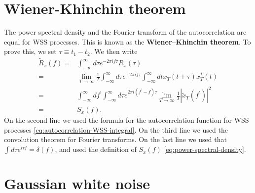 \section{Wiener-Khinchin theorem}

The power spectral density and the Fourier transform of the autocorrelation are
equal for WSS processes. 
This is known as the \textbf{Wiener–Khinchin theorem}.
To prove this, we set $\tau\equiv t_1-t_2$. We then write 
\begin{align}
    \tilde{R}_{x}\left(f\right)
    =& 
    \int_{-\infty}^{\infty}d\tau e^{-2\pi i f \tau}R_{x}\left(\tau\right)
    \nonumber\\
    =& 
    \lim_{T\to\infty}\frac{1}{T}\int_{-\infty}^{\infty}d\tau e^{-2\pi i f \tau} 
    \int_{-\infty}^{\infty} dt x_T\left(t+\tau\right)x^*_T\left(t\right)
    \nonumber\\
    =& 
    \int_{-\infty}^{\infty}df^{\prime}  
    \int_{-\infty}^{\infty}d\tau
        e^{2\pi i \left(f^{\prime}-f\right)\tau} 
        \lim_{T\to\infty}\frac{1}{T}\left|\tilde{x}_T\left(f^{\prime}\right)\right|^2 
    \nonumber\\
    =& 
    S_{x}\left(f\right) 
    .
\end{align}
On the second line we used the formula for the autocorrelation function
for WSS processes \eqref{eq:autocorrelation-WSS-integral}.
On the third line we used the convolution theorem for Fourier transforms.
On the last line we used that $\int d\tau e^{i\tau f}=\delta(f)$, and
used the definition of $S_x(f)$ \eqref{eq:power-spectral-density}.
\section{Gaussian white noise}

